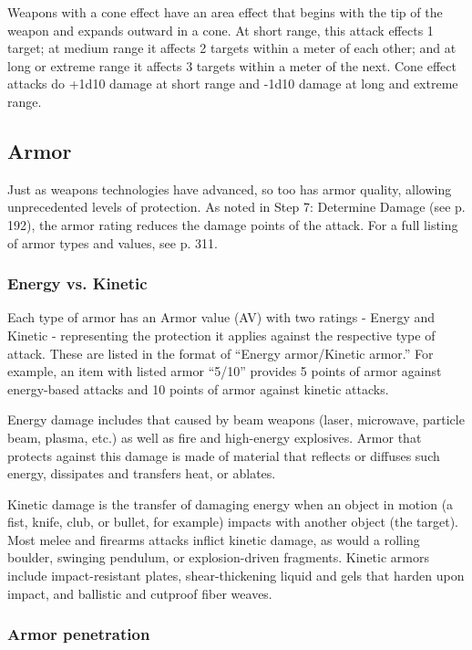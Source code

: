 Weapons with a cone effect have an area effect that begins with the tip of the weapon and expands outward in a cone. At short range, this attack effects 1 target; at medium range it affects 2 targets within a meter of each other; and at long or extreme range it affects 3 targets within a meter of the next. Cone effect attacks do +1d10 damage at short range and -1d10 damage at long and extreme range.


\subsection{Armor}
\label{sec:armor}

Just as weapons technologies have advanced, so too has armor quality, allowing unprecedented levels of protection. As noted in Step 7: Determine Damage (see p. 192), the armor rating reduces the damage points of the attack. For a full listing of armor types and values, see p. 311.

\subsubsection{Energy vs. Kinetic}

Each type of armor has an Armor value (AV) with two ratings - Energy and Kinetic - representing the protection it applies against the respective type of attack. These are listed in the format of ``Energy armor/Kinetic armor.'' For example, an item with listed armor ``5/10'' provides 5 points of armor against energy-based attacks and 10 points of armor against kinetic attacks.

Energy damage includes that caused by beam weapons (laser, microwave, particle beam, plasma, etc.) as well as fire and high-energy explosives. Armor that protects against this damage is made of material that reflects or diffuses such energy, dissipates and transfers heat, or ablates.

Kinetic damage is the transfer of damaging energy when an object in motion (a fist, knife, club, or bullet, for example) impacts with another object (the target). Most melee and firearms attacks inflict kinetic damage, as would a rolling boulder, swinging pendulum, or explosion-driven fragments. Kinetic armors include impact-resistant plates, shear-thickening liquid and gels that harden upon impact, and ballistic and cutproof fiber weaves.

\subsubsection{Armor penetration}

